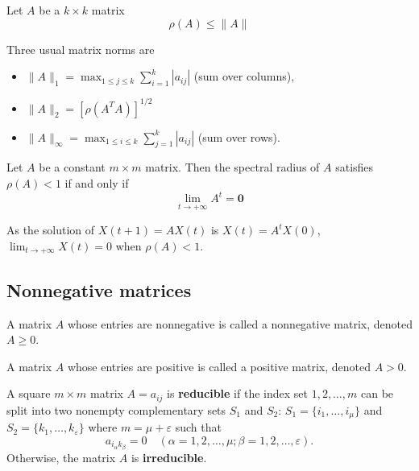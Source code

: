 \begin{theorem}\label{Theo:NormRho}
Let $A$ be a $k\times k$ matrix
$$\rho(A)\leq \| A\| $$
\end{theorem}

Three usual matrix norms are
\begin{itemize}
\item $ \| A\|_1=\max_{1\leq j\leq k}\sum_{i=1}^k|a_{ij}|$ (sum over columns),
\item $ \|A\|_2=[\rho(A^TA)]^{1/2}$
\item $\|A\|_{\infty}=\max_{1\leq i\leq k}\sum_{j=1}^k|a_{ij}|$ (sum over rows).
\end{itemize}








\begin{theorem}\label{Theorem:MatrixConverg}
Let $A$ be a constant $m \times m$ matrix. Then the spectral radius of $A$ satisfies $\rho(A)<1$ if and only if $$\lim_{t\rightarrow + \infty}A^t=\mathbf{0}$$
\end{theorem}

As the solution of $X(t+1)=AX(t)$ is $X(t)=A^tX(0)$, $\lim_{t\rightarrow + \infty} X(t)=0$ when $\rho(A)<1$.

\subsection{Nonnegative matrices}
\begin{definition}
A matrix $A$ whose entries are nonnegative is called a nonnegative matrix, denoted $A\geq 0$.
\end{definition}


\begin{definition}
A matrix $A$ whose entries are positive is called a positive matrix, denoted $A> 0$.
\end{definition}


\begin{definition}
A square $m\times m$  matrix $A=a_{ij}$ is \textbf{reducible} if the index set $1,2, \dots, m$ can be split into two nonempty complementary sets $S_1$ and $S_2$: $S_1=\{i_1,\dots , i_{\mu}\}$ and $S_2=\{k_1,\dots , k_{\varepsilon}\}$ where $m=\mu+\varepsilon$ such that
$$a_{i_\alpha k_{\beta}}=0 \quad (\alpha = 1,2,\dots , \mu; \beta = 1,2, \dots, \varepsilon).$$
Otherwise, the matrix $A$ is \textbf{irreducible}.
\end{definition}


